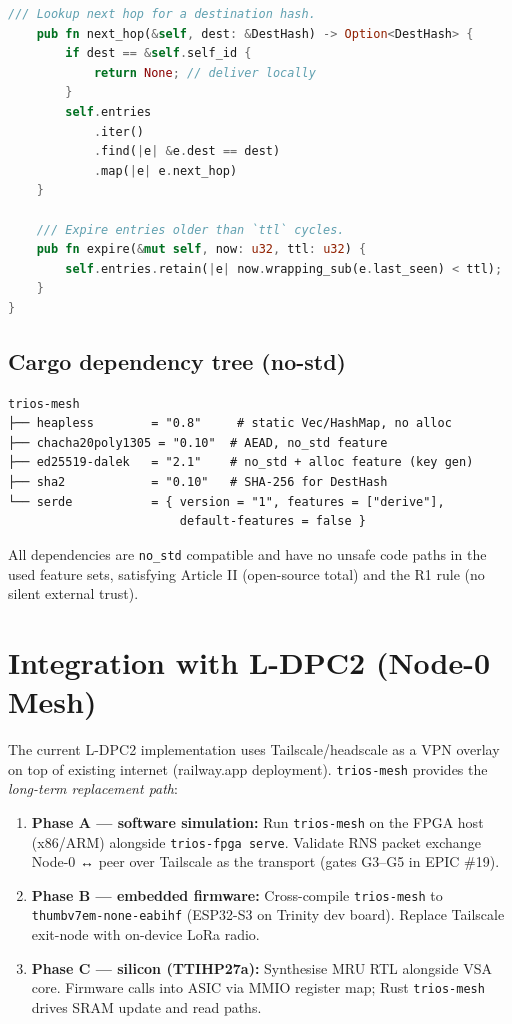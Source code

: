 \begin{lstlisting}[language=Rust, caption={\texttt{crates/trios-mesh/src/lib.rs} — public API sketch}]
    /// Lookup next hop for a destination hash.
    pub fn next_hop(&self, dest: &DestHash) -> Option<DestHash> {
        if dest == &self.self_id {
            return None; // deliver locally
        }
        self.entries
            .iter()
            .find(|e| &e.dest == dest)
            .map(|e| e.next_hop)
    }

    /// Expire entries older than `ttl` cycles.
    pub fn expire(&mut self, now: u32, ttl: u32) {
        self.entries.retain(|e| now.wrapping_sub(e.last_seen) < ttl);
    }
}
\end{lstlisting}

\subsection{Cargo dependency tree (no-std)}

\begin{verbatim}
trios-mesh
├── heapless        = "0.8"     # static Vec/HashMap, no alloc
├── chacha20poly1305 = "0.10"  # AEAD, no_std feature
├── ed25519-dalek   = "2.1"    # no_std + alloc feature (key gen)
├── sha2            = "0.10"   # SHA-256 for DestHash
└── serde           = { version = "1", features = ["derive"],
                        default-features = false }
\end{verbatim}

All dependencies are \texttt{no\_std} compatible and have no unsafe
code paths in the used feature sets, satisfying Article II
(open-source total) and the R1 rule (no silent external trust).

\section{Integration with L-DPC2 (Node-0 Mesh)}

The current L-DPC2 implementation uses Tailscale/headscale as a
VPN overlay on top of existing internet (railway.app deployment).
\texttt{trios-mesh} provides the \emph{long-term replacement path}:

\begin{enumerate}
  \item \textbf{Phase A — software simulation:}
        Run \texttt{trios-mesh} on the FPGA host (x86/ARM) alongside
        \texttt{trios-fpga serve}.
        Validate RNS packet exchange Node-0 ↔ peer over Tailscale
        as the transport (gates G3–G5 in EPIC \#19).
  \item \textbf{Phase B — embedded firmware:}
        Cross-compile \texttt{trios-mesh} to \texttt{thumbv7em-none-eabihf}
        (ESP32-S3 on Trinity dev board).
        Replace Tailscale exit-node with on-device LoRa radio.
  \item \textbf{Phase C — silicon (TTIHP27a):}
        Synthesise MRU RTL alongside VSA core.
        Firmware calls into ASIC via MMIO register map; Rust
        \texttt{trios-mesh} drives SRAM update and read paths.
\end{enumerate}

